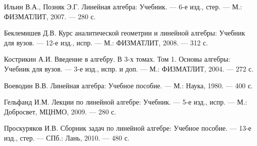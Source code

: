 \documentclass[12pt,a4paper]{scrartcl}
\begin{document}
	\newpage
	
	\begin{thebibliography}{6}
		
		Ильин В.А., Позняк Э.Г. Линейная алгебра: Учебник. --- 6-е изд., стер. --- М.: ФИЗМАТЛИТ, 2007. --- 280 с. 

		Беклемишев Д.В. Курс аналитической геометрии и линейной алгебры: Учебник для вузов. --- 12-е изд., испр. --- М.: ФИЗМАТЛИТ, 2008. --- 312 с. 
		
		Кострикин А.И. Введение в алгебру. В 3-х томах. Том 1. Основы алгебры: Учебник для вузов. --- 3-е изд., испр. и доп. --- М.: ФИЗМАТЛИТ, 2004. --- 272 с.
		
		Воеводин В.В. Линейная алгебра: Учебное пособие. --- М.: Наука, 1980. --- 400 с. 

		
		Гельфанд И.М. Лекции по линейной алгебре: Учебник. --- 5-е изд., испр. --- М.: Добросвет, МЦНМО, 2009. --- 280 с.
		
		Проскуряков И.В. Сборник задач по линейной алгебре: Учебное пособие. --- 13-е изд., стер. --- СПб.: Лань, 2010. --- 480 с.
		
	\end{thebibliography}
	
\end{document}
